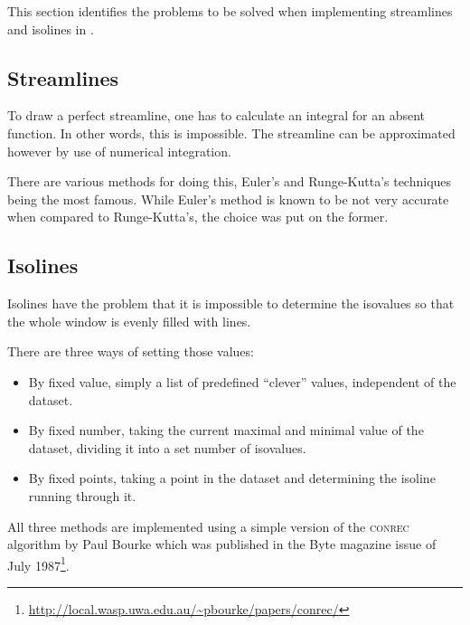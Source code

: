 
This section identifies the problems to be solved when implementing streamlines
and isolines in \fluids{}.

\subsection{Streamlines}

To draw a perfect streamline, one has to calculate an integral for an absent
function. In other words, this is impossible. The streamline can be
approximated however by use of numerical integration. 

There are various methods for doing this, Euler's and Runge-Kutta's techniques
being the most famous. While Euler's method is known to be not very accurate
when compared to Runge-Kutta's, the choice was put on the former.

\subsection{Isolines}

Isolines have the problem that it is impossible to determine the isovalues so
that the whole window is evenly filled with lines.

There are three ways of setting those values:

\begin{itemize}

\item By fixed value, simply a list of predefined ``clever'' values,
independent of the dataset.

\item By fixed number, taking the current maximal and minimal value of the
dataset, dividing it into a set number of isovalues.

\item By fixed points, taking a point in the dataset and determining the
isoline running through it.

\end{itemize}

All three methods are implemented using a simple version of the \textsc{conrec}
algorithm by Paul Bourke which was published in the Byte magazine issue of July
1987\footnote{\url{http://local.wasp.uwa.edu.au/~pbourke/papers/conrec/}}.

